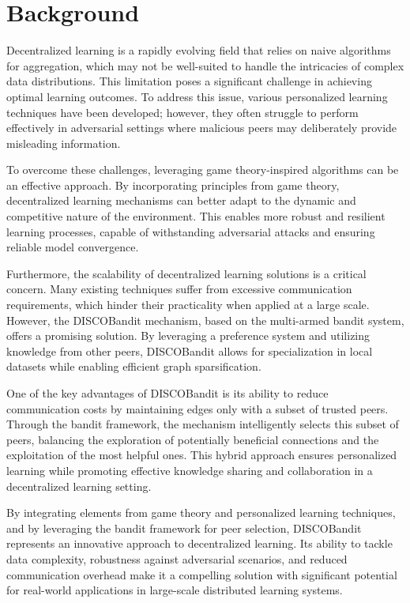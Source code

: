 \documentclass{article}
\begin{document}
\newpage
\section{Background} %
\label{sec:background}
Decentralized learning is a rapidly evolving field that relies on naive algorithms for aggregation, which may not be well-suited to handle the intricacies of complex data distributions. This limitation poses a significant challenge in achieving optimal learning outcomes. To address this issue, various personalized learning techniques have been developed; however, they often struggle to perform effectively in adversarial settings where malicious peers may deliberately provide misleading information.

To overcome these challenges, leveraging game theory-inspired algorithms can be an effective approach. By incorporating principles from game theory, decentralized learning mechanisms can better adapt to the dynamic and competitive nature of the environment. This enables more robust and resilient learning processes, capable of withstanding adversarial attacks and ensuring reliable model convergence.

Furthermore, the scalability of decentralized learning solutions is a critical concern. Many existing techniques suffer from excessive communication requirements, which hinder their practicality when applied at a large scale. However, the DISCOBandit mechanism, based on the multi-armed bandit system, offers a promising solution. By leveraging a preference system and utilizing knowledge from other peers, DISCOBandit allows for specialization in local datasets while enabling efficient graph sparsification.

One of the key advantages of DISCOBandit is its ability to reduce communication costs by maintaining edges only with a subset of trusted peers. Through the bandit framework, the mechanism intelligently selects this subset of peers, balancing the exploration of potentially beneficial connections and the exploitation of the most helpful ones. This hybrid approach ensures personalized learning while promoting effective knowledge sharing and collaboration in a decentralized learning setting.

By integrating elements from game theory and personalized learning techniques, and by leveraging the bandit framework for peer selection, DISCOBandit represents an innovative approach to decentralized learning. Its ability to tackle data complexity, robustness against adversarial scenarios, and reduced communication overhead make it a compelling solution with significant potential for real-world applications in large-scale distributed learning systems.
\end{document}
